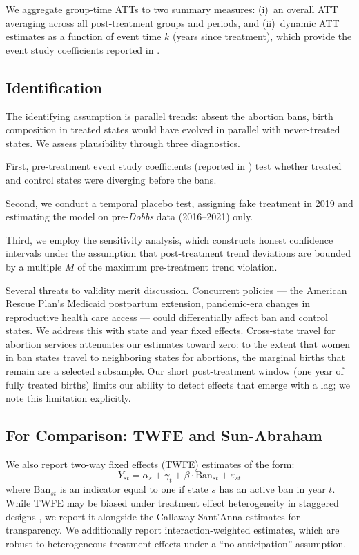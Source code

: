 \documentclass[12pt]{article}
\begin{document}
We aggregate group-time ATTs to two summary measures: (i)~an overall ATT averaging across all post-treatment groups and periods, and (ii)~dynamic ATT estimates as a function of event time $k$ (years since treatment), which provide the event study coefficients reported in .

\subsection{Identification}

The identifying assumption is parallel trends: absent the abortion bans, birth composition in treated states would have evolved in parallel with never-treated states. We assess plausibility through three diagnostics.

First, pre-treatment event study coefficients (reported in ) test whether treated and control states were diverging before the bans.

Second, we conduct a temporal placebo test, assigning fake treatment in 2019 and estimating the model on pre-\emph{Dobbs} data (2016--2021) only.

Third, we employ the \citet{rambachan2023more} sensitivity analysis, which constructs honest confidence intervals under the assumption that post-treatment trend deviations are bounded by a multiple $\bar{M}$ of the maximum pre-treatment trend violation.

Several threats to validity merit discussion. Concurrent policies --- the American Rescue Plan's Medicaid postpartum extension, pandemic-era changes in reproductive health care access --- could differentially affect ban and control states. We address this with state and year fixed effects. Cross-state travel for abortion services attenuates our estimates toward zero: to the extent that women in ban states travel to neighboring states for abortions, the marginal births that remain are a selected subsample. Our short post-treatment window (one year of fully treated births) limits our ability to detect effects that emerge with a lag; we note this limitation explicitly.

\subsection{For Comparison: TWFE and Sun-Abraham}

We also report two-way fixed effects (TWFE) estimates of the form:
\begin{equation}
Y_{st} = \alpha_s + \gamma_t + \beta \cdot \text{Ban}_{st} + \varepsilon_{st}
\label{eq:twfe}
\end{equation}
where $\text{Ban}_{st}$ is an indicator equal to one if state $s$ has an active ban in year $t$. While TWFE may be biased under treatment effect heterogeneity in staggered designs \citep{goodman2021difference}, we report it alongside the Callaway-Sant'Anna estimates for transparency. We additionally report \citet{sun2021estimating} interaction-weighted estimates, which are robust to heterogeneous treatment effects under a ``no anticipation'' assumption.
\end{document}
